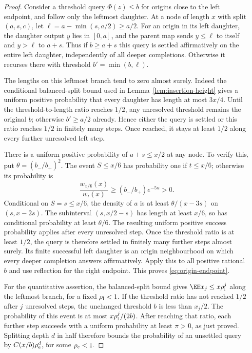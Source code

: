\documentclass[11pt,letterpaper]{article}
\begin{document}
\begin{proof}
Consider a threshold query $\Phi(z)\le b$ for origins close to the
left endpoint, and follow only the leftmost daughter. At a node of
length $x$ with split $(a,s,c)$, let
$\ell=a-\min(s,a/2)\ge a/2$. For an origin in its left daughter,
the daughter output $y$ lies in $[0,a]$, and the parent map sends
$y\le\ell$ to itself and $y>\ell$ to $a+s$.
Thus if $b\ge a+s$ this query is settled affirmatively on the
entire left daughter, independently of all deeper completions.
Otherwise it recurses there with threshold
$b'=\min(b,\ell)$.

The lengths on this leftmost branch tend to zero almost surely.
Indeed the conditional balanced-split bound used in
Lemma~\ref{lem:insertion-height} gives a uniform positive probability
that every daughter has length at most $3x/4$.
Until the threshold-to-length ratio reaches $1/2$, any unresolved
threshold remains the original $b$; otherwise
$b'\ge a/2$ already. Hence either the query is settled or this ratio
reaches $1/2$ in finitely many steps. Once reached, it stays at least
$1/2$ along every further unresolved left step.

There is a uniform positive probability of $a+s\le x/2$ at any
node. To verify this, put $\theta=(b_-/b_+)^2$.
The event $S\le x/6$ has probability one if $t\le x/6$;
otherwise its probability is
\[
 \frac{w_{x/6}(x)}{w_t(x)}
 \ge (b_-/b_+)e^{-5\kappa}>0.
\]
Conditional on $S=s\le x/6$, the density of $a$ is at least
$\theta/(x-3s)$ on $(s,x-2s)$.
The subinterval $(s,x/2-s)$ has length at least $x/6$, so has
conditional probability at least $\theta/6$.
The resulting uniform positive success probability applies after
every unresolved step. Once the threshold ratio is at least $1/2$,
the query is therefore settled in finitely many further steps almost
surely. Its finite successful left daughter is an origin neighbourhood
on which every deeper completion answers affirmatively.
Apply this to all positive rational $b$ and use reflection for the
right endpoint. This proves \eqref{eq:origin-endpoint}.

For the quantitative assertion, the balanced-split bound gives
$\EE x_j\le x\rho_{\rm l}^j$ along the leftmost branch, for a
fixed $\rho_{\rm l}<1$. If the threshold ratio has not reached
$1/2$ after $j$ unresolved steps, the unchanged threshold $b$ is
less than $x_j/2$. The probability of this event is at most
$x\rho_{\rm l}^j/(2b)$.
After reaching that ratio, each further step succeeds with a uniform
probability at least $\pi>0$, as just proved.
Splitting depth $d$ in half therefore bounds the probability of an
unsettled query by $C(x/b)\rho_{\rm e}^d$, for some
$\rho_{\rm e}<1$.


\end{proof}
\end{document}
